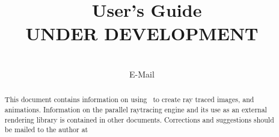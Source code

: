 \documentclass[11pt]{article}
\title{\RAY\ User's Guide \\ UNDER DEVELOPMENT }
\author{\AUTHORS\ \\ E-Mail \EMAIL}
\date{}
\begin{document}
\maketitle
\begin{abstract}

This document contains information on using \RAY\ to create ray traced 
images, and animations.  Information on the parallel raytracing engine and its 
use as an external rendering library is contained in other documents.  
Corrections and suggestions should be mailed to the author at {\em \EMAIL} 
\end{abstract}
\newpage

\tableofcontents
\newpage






\newpage
\label{index:label}
\printindex
\end{document}
